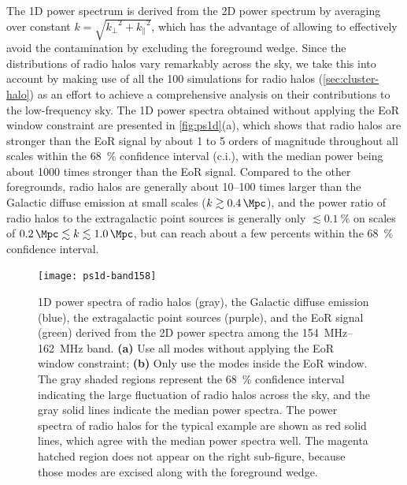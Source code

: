 \documentclass[modern]{aastex62}
\newcommand{\klos}{\text{$k_{\parallel}$}}
\newcommand{\kperp}{\text{$k_{\bot}$}}
\begin{document}
The 1D power spectrum is derived from the 2D power spectrum by averaging
over constant $k = \sqrt{\kperp^2 + \klos^2}$, which has the advantage of
allowing to effectively avoid the contamination by excluding the
foreground wedge.
Since the distributions of radio halos vary remarkably across the sky,
we take this into account by making use of all the 100 simulations for
radio halos (\autoref{sec:cluster-halo}) as an effort to achieve a
comprehensive analysis on their contributions to the low-frequency sky.
The 1D power spectra obtained without applying the EoR window constraint
are presented in \autoref{fig:ps1d}(a), which shows that radio halos are
stronger than the EoR signal by about 1 to 5 orders of magnitude
throughout all scales within the \SI{68}{\percent} confidence interval
(c.i.), with the median power being about 1000 times stronger than the
EoR signal.
Compared to the other foregrounds, radio halos are generally about
\numrange{10}{100} times larger than the Galactic diffuse emission at
small scales ($k \gtrsim \SI{0.4}{\per\Mpc}$),
and the power ratio of radio halos to the extragalactic point sources
is generally only $\lesssim \SI{0.1}{\percent}$ on scales of
$\SI{0.2}{\per\Mpc} \lesssim k \lesssim \SI{1.0}{\per\Mpc}$,
but can reach about a few percents within the \SI{68}{\percent}
confidence interval.

\begin{figure}
  \centering
  \texttt{[image: ps1d-band158]}
  \caption{\label{fig:ps1d}%
    1D power spectra of radio halos (gray), the Galactic diffuse
    emission (blue), the extragalactic point sources (purple), and the
    EoR signal (green) derived from the 2D power spectra among the
    \SIrange{154}{162}{\MHz} band.
    \textbf{(a)} Use all modes without applying the EoR window constraint;
    \textbf{(b)} Only use the modes inside the EoR window.
    The gray shaded regions represent the \SI{68}{\percent} confidence
    interval indicating the large fluctuation of radio halos across the
    sky, and the gray solid lines indicate the median power spectra.
    The power spectra of radio halos for the typical example are shown as
    red solid lines, which agree with the median power spectra well.
    The magenta hatched region does not appear on the right sub-figure,
    because those modes are excised along with the foreground wedge.
  }
\end{figure}
\end{document}
